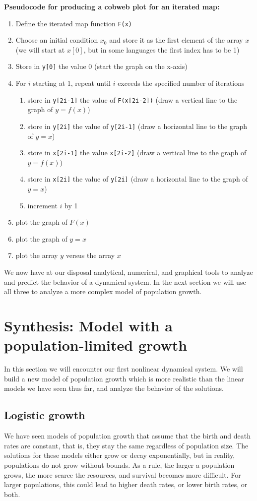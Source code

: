 \documentclass[11pt]{book}
\begin{document}
\textbf{Pseudocode for producing a cobweb plot for an iterated map:}
\begin{enumerate}
\item Define the iterated map function \texttt{F(x)}
\item Choose an initial condition $x_0$ and store it as the first element of the array $x$ (we will start at $x[0]$, but in some languages the first index has to be 1)
\item Store in \texttt{y[0]} the value 0 (start the graph on the x-axis)
\item For $i$ starting at 1, repeat until $i$ exceeds the specified number of iterations
\begin{enumerate}
\item store in \texttt{y[2i-1]} the value of \texttt{F(x[2i-2])}  (draw a vertical line to the graph of $y=f(x)$)
\item store in \texttt{y[2i]} the value of \texttt{y[2i-1]}  (draw a horizontal line to the graph of $y=x$)
\item store in \texttt{x[2i-1]} the value \texttt{x[2i-2]} (draw a vertical line to the graph of $y=f(x)$)
\item store in \texttt{x[2i]} the value of \texttt{y[2i]} (draw a horizontal line to the graph of $y=x$)
\item increment $i$ by 1
\end{enumerate}
\item plot the graph of $F(x)$
\item plot the graph of $y=x$
\item plot the array $y$ versus the array $x$
\end{enumerate}
We now have at our disposal analytical, numerical, and graphical tools to analyze and predict the behavior of a dynamical system. In the next section we will use all three to analyze a more complex model of population growth.

\section[Logistic model]{Synthesis: Model with a population-limited growth}
In this section we will encounter our first nonlinear dynamical system. We will build a new model of population growth which is more realistic than the linear models we have seen thus far, and analyze the behavior of the solutions.
\subsection{Logistic growth}
We have seen models of population growth that assume that the birth and death rates are constant, that is, they stay the same regardless of population size. The solutions for these models either grow or decay exponentially, but in reality, populations do not grow without bounds. As a rule, the larger a population grows, the more scarce the resources, and survival becomes more difficult. For larger populations, this could lead to higher death rates, or lower birth rates, or both.
\end{document}
